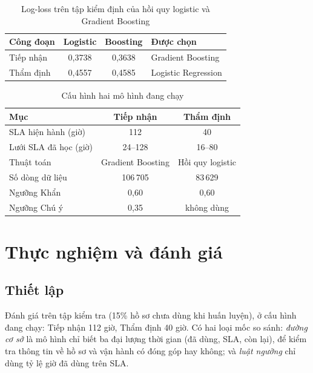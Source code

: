 \documentclass[journal]{IEEEtran}
\begin{document}
\begin{table}[t]
\caption{Log-loss trên tập kiểm định của hồi quy logistic và Gradient Boosting}
\label{tab:select}
\centering
\begin{tabular}{|l|c|c|l|}
\hline
Công đoạn & Logistic & Boosting & Được chọn \\
\hline
Tiếp nhận & 0,3738 & 0,3638 & Gradient Boosting \\
Thẩm định & 0,4557 & 0,4585 & Logistic Regression \\
\hline
\end{tabular}
\end{table}

\begin{table}[t]
\caption{Cấu hình hai mô hình đang chạy}
\label{tab:cfg}
\centering
\small
\begin{tabular}{|l|c|c|}
\hline
Mục & Tiếp nhận & Thẩm định \\
\hline
SLA hiện hành (giờ) & 112 & 40 \\
Lưới SLA đã học (giờ) & 24--128 & 16--80 \\
Thuật toán & Gradient Boosting & Hồi quy logistic \\
Số dòng dữ liệu & 106\,705 & 83\,629 \\
Ngưỡng Khẩn & 0,60 & 0,60 \\
Ngưỡng Chú ý & 0,35 & không dùng \\
\hline
\end{tabular}
\end{table}

\section{Thực nghiệm và đánh giá}
\subsection{Thiết lập}
Đánh giá trên tập kiểm tra (15\% hồ sơ chưa dùng khi huấn luyện), ở cấu hình đang chạy: Tiếp nhận 112 giờ, Thẩm định 40 giờ. Có hai loại mốc so sánh: \emph{đường cơ sở} là mô hình chỉ biết ba đại lượng thời gian (đã dùng, SLA, còn lại), để kiểm tra thông tin về hồ sơ và vận hành có đóng góp hay không; và \emph{luật ngưỡng} chỉ dùng tỷ lệ giờ đã dùng trên SLA.
\end{document}
